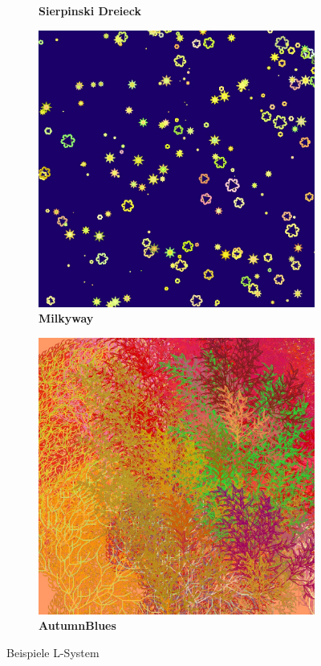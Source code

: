 \documentclass[../mciAusarbeitung.tex]{subfiles}
\begin{document}
\begin{figure}[H]
\begin{subfigure}{0.5\linewidth}
		\caption[Sierpinski Dreieck]{\textbf{Sierpinski Dreieck}}  
	\end{subfigure}		
	\begin{subfigure}{0.5\linewidth}
 		\includegraphics[width=0.95\linewidth]{"img/lsystem_milkyway.jpg"}
		\caption[Milkyway]{\textbf{Milkyway}}  
	\end{subfigure}	
	\begin{subfigure}{0.5\linewidth}
 		\includegraphics[width=0.95\linewidth]{"img/lsystem_autumn.jpg"}
		\caption[AutumnBlues]{\textbf{AutumnBlues}}  
	\end{subfigure}	
	\caption[BWinzen:Beispiele L-System]{Beispiele L-System}
\end{figure}
\end{document}
